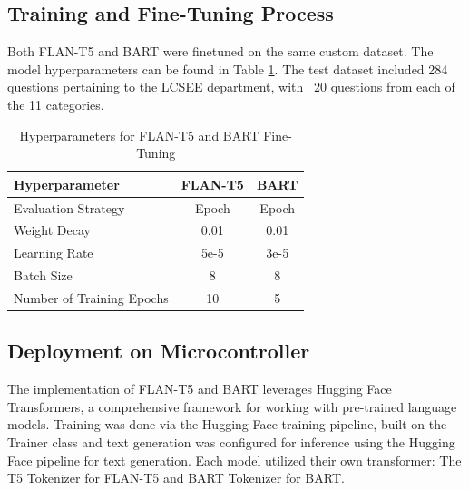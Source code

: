 \documentclass[conference]{IEEEtran}
\begin{document}
\subsection{Training and Fine-Tuning Process} 
Both FLAN-T5 and BART were finetuned on the same custom dataset. The model hyperparameters can be found in Table \ref{tab:hyperparams}.
The test dataset included 284 questions pertaining to the LCSEE department, with ~20 questions from each of the 11 categories. 

\begin{table}[!ht]
    \centering
    \caption{Hyperparameters for FLAN-T5 and BART Fine-Tuning}
    \label{tab:hyperparams}
    \begin{tabular}{l|c|c}
        \toprule
        \textbf{Hyperparameter}         & \textbf{FLAN-T5}         & \textbf{BART} \\
        \midrule
        Evaluation Strategy             & Epoch                   & Epoch                     \\ 
        Weight Decay                    & 0.01                    & 0.01                      \\ 
        Learning Rate                   & 5e-5                    & 3e-5                      \\ 
        Batch Size                      & 8                       & 8                         \\ 
        Number of Training Epochs       & 10                      & 5                         \\ 
        \bottomrule
    \end{tabular}
\end{table}

\subsection{Deployment on Microcontroller}
The implementation of FLAN-T5 and BART leverages Hugging Face Transformers, a comprehensive framework for working with pre-trained language models.
Training was done via the Hugging Face training pipeline, built on the Trainer class and text generation was configured for inference using the Hugging Face pipeline for text generation.
Each model utilized their own transformer: The T5 Tokenizer \cite{b10} for FLAN-T5 and BART Tokenizer \cite{b11} for BART.
\end{document}

